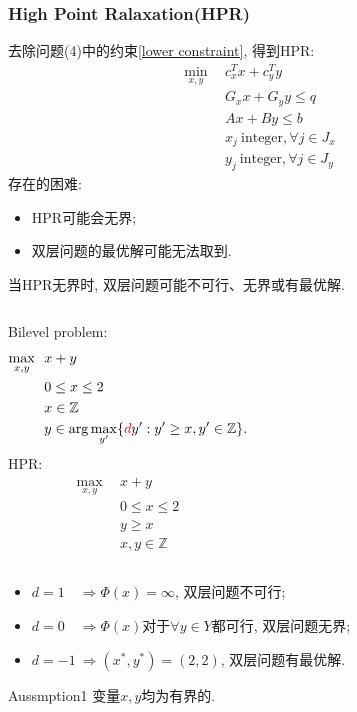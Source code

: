 \documentclass[10pt]{beamer}
\begin{document}
\begin{frame}
	\frametitle{High Point Ralaxation(HPR)}
	去除问题(4)中的约束\eqref{lower constraint}, 得到HPR:
	\begin{subequations}
		\begin{align}
			\min_{x,y}~~&c_{x}^{T}x+c_{y}^{T}y \\
			&G_xx+G_yy \leq q  \\
			&Ax+By\leq b\\
			&x_{j}\mathrm{~integer}, \forall j\in J_{x}  \\
			&y_{j}\mathrm{~integer}, \forall j\in J_{y}
		\end{align}
	\end{subequations}
	存在的困难:
	\begin{itemize}
		\item HPR可能会无界;
		\item 双层问题的最优解可能无法取到.
	\end{itemize}
\end{frame}

\begin{frame}
	当HPR无界时, 双层问题可能不可行、无界或有最优解. 
	\begin{tcolorbox}
		\begin{columns}[c]
			Bilevel problem:
			\begin{align*}
				\max_{x,y}~~&x+y  \\
				&0\leq x\leq2 \\
				&x\in\mathbb{Z} \\
				&y\in\arg\max_{y^{\prime}}\{{\color{red}d}y^{\prime}:y^{\prime}\geq x,y^{\prime}\in\mathbb{Z}\}.
			\end{align*}
			HPR:
			\begin{align*}
				\max_{x,y}~~&x+y\\
				& 0\leq x\leq2\\
				& y\geq x\\
				& x,y\in\mathbb{Z}
			\end{align*}
		\end{columns}
		\begin{itemize}
			\item $d=1\quad \Rightarrow \Phi(x)=\infty $, 双层问题不可行; 
			\item $d=0\quad \Rightarrow \Phi(x)$对于$\forall y\in Y$都可行, 双层问题无界; 
			\item $d=-1~\Rightarrow (x^*,y^*)=(2,2)$, 双层问题有最优解.
		\end{itemize}
	\end{tcolorbox}
	\begin{block}{Aussmption1}
		变量$x,y$均为有界的.
	\end{block}
\end{frame}
\end{document}
